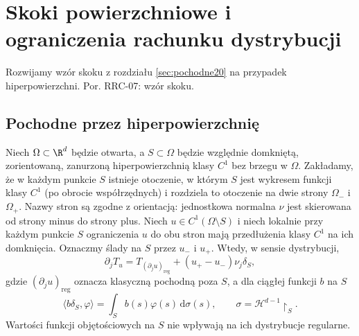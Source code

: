 \setcounter{section}{33}
\section{Skoki powierzchniowe i ograniczenia rachunku dystrybucji}
\label{sec:dt-jumps-products}
\providecommand{\atlasref}[2]{#2}
Rozwijamy wzór skoku z rozdziału \ref{sec:pochodne20}
na przypadek hiperpowierzchni. Por.
\atlasref{PDE-07::thm:pde7-jump}{RRC-07: wzór skoku}.
\subsection{Pochodne przez hiperpowierzchnię}
\begin{twierdzenie}
\label{thm:dt-hypersurface-jump}
Niech $\Omega\subset\R^d$ będzie otwarta, a
$S\subset\Omega$ będzie względnie domkniętą,
zorientowaną, zanurzoną hiperpowierzchnią klasy $C^1$
bez brzegu w $\Omega$. Zakładamy, że w każdym
punkcie $S$ istnieje otoczenie, w którym $S$ jest
wykresem funkcji klasy $C^1$ (po obrocie współrzędnych)
i rozdziela to otoczenie na dwie strony $\Omega_-$
i $\Omega_+$. Nazwy stron są zgodne z orientacją:
jednostkowa normalna $\nu$ jest skierowana
od strony minus do strony plus.
Niech $u\in C^1(\Omega\setminus S)$ i niech lokalnie
przy każdym punkcie $S$ ograniczenia $u$ do obu stron
mają przedłużenia klasy $C^1$ na ich domknięcia.
Oznaczmy ślady na $S$ przez $u_-$ i $u_+$.
Wtedy, w sensie dystrybucji,
\begin{equation}\label{eq:dt-hypersurface-jump}
 \partial_jT_u=T_{(\partial_ju)_{\mathrm{reg}}}
 +(u_+-u_-)\nu_j\delta_S,
\end{equation}
gdzie $(\partial_ju)_{\mathrm{reg}}$ oznacza klasyczną
pochodną poza $S$, a dla ciągłej funkcji $b$ na $S$
\[
 \langle b\delta_S,\varphi\rangle
 =\int_S b(s)\varphi(s)\,\mathrm d\sigma(s),
 \qquad \sigma=\mathcal H^{d-1}\!\restriction_S.
\]
Wartości funkcji objętościowych na $S$ nie wpływają
na ich dystrybucje regularne.
\end{twierdzenie}
